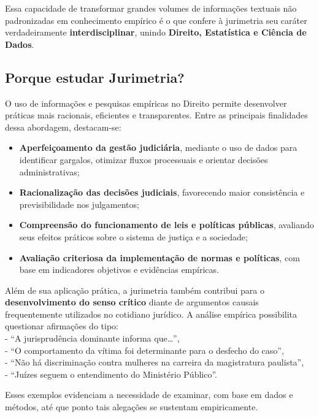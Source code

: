 \documentclass[
  letterpaper,
  DIV=11,
  numbers=noendperiod]{scrreprt}
\providecommand{\tightlist}{%
  \setlength{\itemsep}{0pt}\setlength{\parskip}{0pt}}
\begin{document}
Essa capacidade de transformar grandes volumes de informações textuais
não padronizadas em conhecimento empírico é o que confere à jurimetria
seu caráter verdadeiramente \textbf{interdisciplinar}, unindo
\textbf{Direito, Estatística e Ciência de Dados}.

\subsection{Porque estudar Jurimetria?}\label{porque-estudar-jurimetria}

O uso de informações e pesquisas empíricas no Direito permite
desenvolver práticas mais racionais, eficientes e transparentes. Entre
as principais finalidades dessa abordagem, destacam-se:

\begin{itemize}
\tightlist
\item
  \textbf{Aperfeiçoamento da gestão judiciária}, mediante o uso de dados
  para identificar gargalos, otimizar fluxos processuais e orientar
  decisões administrativas;
\item
  \textbf{Racionalização das decisões judiciais}, favorecendo maior
  consistência e previsibilidade nos julgamentos;
\item
  \textbf{Compreensão do funcionamento de leis e políticas públicas},
  avaliando seus efeitos práticos sobre o sistema de justiça e a
  sociedade;
\item
  \textbf{Avaliação criteriosa da implementação de normas e políticas},
  com base em indicadores objetivos e evidências empíricas.
\end{itemize}

Além de sua aplicação prática, a jurimetria também contribui para o
\textbf{desenvolvimento do senso crítico} diante de argumentos causais
frequentemente utilizados no cotidiano jurídico. A análise empírica
possibilita questionar afirmações do tipo:\\
- ``A jurisprudência dominante informa que\ldots{}'',\\
- ``O comportamento da vítima foi determinante para o desfecho do
caso'',\\
- ``Não há discriminação contra mulheres na carreira da magistratura
paulista'',\\
- ``Juízes seguem o entendimento do Ministério Público''.

Esses exemplos evidenciam a necessidade de examinar, com base em dados e
métodos, até que ponto tais alegações se sustentam empiricamente.
\end{document}
